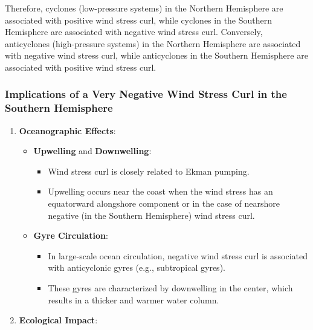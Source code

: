 \documentclass[
  letterpaper,
  DIV=11,
  numbers=noendperiod]{scrartcl}
\providecommand{\tightlist}{%
  \setlength{\itemsep}{0pt}\setlength{\parskip}{0pt}}\usepackage{longtable,booktabs,array}
\begin{document}
Therefore, cyclones (low-pressure systems) in the Northern Hemisphere
are associated with positive wind stress curl, while cyclones in the
Southern Hemisphere are associated with negative wind stress curl.
Conversely, anticyclones (high-pressure systems) in the Northern
Hemisphere are associated with negative wind stress curl, while
anticyclones in the Southern Hemisphere are associated with positive
wind stress curl.

\subsubsection{Implications of a Very Negative Wind Stress Curl in the
Southern
Hemisphere}\label{implications-of-a-very-negative-wind-stress-curl-in-the-southern-hemisphere}

\begin{enumerate}
\def\labelenumi{\arabic{enumi}.}
\item
  \textbf{Oceanographic Effects}:

  \begin{itemize}
  \tightlist
  \item
    \textbf{Upwelling} and \textbf{Downwelling}:

    \begin{itemize}
    \tightlist
    \item
      Wind stress curl is closely related to Ekman pumping.
    \item
      Upwelling occurs near the coast when the wind stress has an
      equatorward alongshore component or in the case of nearshore
      negative (in the Southern Hemisphere) wind stress curl.
    \end{itemize}
  \item
    \textbf{Gyre Circulation}:

    \begin{itemize}
    \tightlist
    \item
      In large-scale ocean circulation, negative wind stress curl is
      associated with anticyclonic gyres (e.g., subtropical gyres).
    \item
      These gyres are characterized by downwelling in the center, which
      results in a thicker and warmer water column.
    \end{itemize}
  \end{itemize}
\item
  \textbf{Ecological Impact}:


\end{enumerate}
\end{document}
